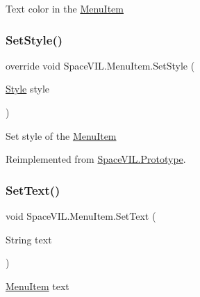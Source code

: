 Text color in the \mbox{\hyperlink{class_space_v_i_l_1_1_menu_item}{Menu\+Item}} 

\mbox{\label{class_space_v_i_l_1_1_menu_item_a836d866b3d92b8217a49ddd19b0a35f5}} 
\subsubsection{\texorpdfstring{Set\+Style()}{SetStyle()}}
{\footnotesize\ttfamily override void Space\+V\+I\+L.\+Menu\+Item.\+Set\+Style (\begin{DoxyParamCaption}\item[{\mbox{\hyperlink{class_space_v_i_l_1_1_decorations_1_1_style}{Style}}}]{style }\end{DoxyParamCaption})\hspace{0.3cm}{\ttfamily [virtual]}}



Set style of the \mbox{\hyperlink{class_space_v_i_l_1_1_menu_item}{Menu\+Item}} 



Reimplemented from \mbox{\hyperlink{class_space_v_i_l_1_1_prototype_ae96644a6ace490afb376fb542161e541}{Space\+V\+I\+L.\+Prototype}}.

\mbox{\label{class_space_v_i_l_1_1_menu_item_aaf17e0e26cc6532de675cc6d2fdafc1e}} 
\subsubsection{\texorpdfstring{Set\+Text()}{SetText()}}
{\footnotesize\ttfamily void Space\+V\+I\+L.\+Menu\+Item.\+Set\+Text (\begin{DoxyParamCaption}\item[{String}]{text }\end{DoxyParamCaption})}



\mbox{\hyperlink{class_space_v_i_l_1_1_menu_item}{Menu\+Item}} text 

\mbox{\label{class_space_v_i_l_1_1_menu_item_a04dea3a18d50459b3a5bd25c4421f56b}} 
